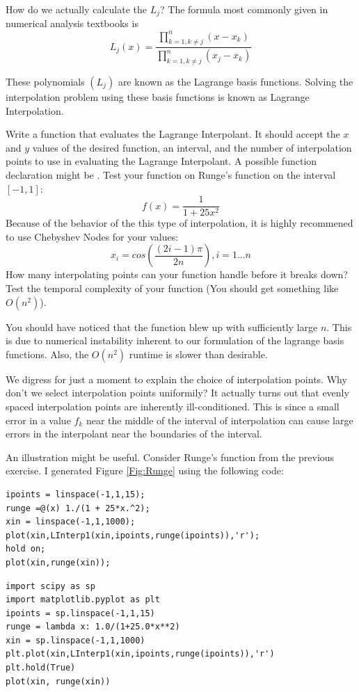 How do we actually calculate the $L_j$? The formula most commonly given in numerical analysis textbooks is
\[
L_j(x) = \frac{\displaystyle\prod_{k=1, k \neq j}^n (x-x_k)}{\displaystyle\prod_{k=1, k \neq j}^n (x_j-x_k)}
\]

These polynomials $(L_j)$ are known as the Lagrange basis functions. Solving the interpolation problem using these basis functions is known as Lagrange Interpolation.

\begin{problem}
Write a function that evaluates the Lagrange Interpolant.  It should accept the $x$ and $y$ values of the desired function, an interval, and the number of interpolation points to use in evaluating the Lagrange Interpolant.  A possible function declaration might be . Test your function on Runge's function on the interval $[-1,1]$:
\[
f(x) = \frac{1}{1+25x^2}
\]
Because of the behavior of the this type of interpolation, it is highly recommened to use Chebyshev Nodes for your  values:
\[
x_i = cos\left(\frac{(2i-1)\pi}{2n}\right), i = 1\ldots n
\]
How many interpolating points can your function handle before it breaks down? Test the temporal complexity of your function (You should get something like $O(n^2)$).
\end{problem}

You should have noticed that the function blew up with sufficiently large $n$. This is due to numerical instability inherent to our formulation of the lagrange basis functions. Also, the $O(n^2)$ runtime is slower than desirable.

We digress for just a moment to explain the choice of interpolation points. Why don't we select interpolation points uniformily? It actually turns out that evenly spaced interpolation points are inherently ill-conditioned. This is since a small error in a value $f_k$ near the middle of the interval of interpolation can cause large errors in the interpolant near the boundaries of the interval.

An illustration might be useful. Consider Runge's function from the previous exercise. I generated Figure \ref{Fig:Runge} using the following code:

\begin{matlab}
\begin{lstlisting}[style=matlab]
ipoints = linspace(-1,1,15);
runge =@(x) 1./(1 + 25*x.^2);
xin = linspace(-1,1,1000);
plot(xin,LInterp1(xin,ipoints,runge(ipoints)),'r');
hold on;
plot(xin,runge(xin));
\end{lstlisting}
\end{matlab}
\begin{python}
\begin{lstlisting}[style=python]
import scipy as sp
import matplotlib.pyplot as plt
ipoints = sp.linspace(-1,1,15)
runge = lambda x: 1.0/(1+25.0*x**2)
xin = sp.linspace(-1,1,1000)
plt.plot(xin,LInterp1(xin,ipoints,runge(ipoints)),'r')
plt.hold(True)
plot(xin, runge(xin))
\end{lstlisting}
\end{python}

